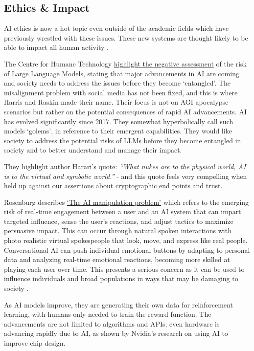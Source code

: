 \subsection{Ethics \& Impact}
AI ethics is now a hot topic even outside of the academic fields which have previously wrestled with these issues. These new systems are thought likely to be able to impact all human activity \cite{eloundou2023gpts}. \par
The Centre for Humane Technology \href{https://www.humanetech.com/key-issues}{highlight the negative assessment} of the risk of Large Language Models, stating that major advancements in AI are coming and society needs to address the issues before they become `entangled'. The misalignment problem with social media has not been fixed, and this is where Harris and Raskin made their name. Their focus is not on AGI apocalypse scenarios but rather on the potential consequences of rapid AI advancements. AI has evolved significantly since 2017. They somewhat hyperbolically call such models `golems', in reference to their emergent capabilities. They would like society to address the potential risks of LLMs before they become entangled in society and to better understand and manage their impact.\par
They highlight author \cite{harari2014sapiens} Harari's quote: \textit{``What nukes are to the physical world, AI is to the virtual and symbolic world.''} - and this quote feels very compelling when held up against our assertions about cryptographic end points and trust.\par
Rosenburg describes \href{https://bigthink.com/the-present/danger-conversational-ai/}{`The AI manipulation problem'} which refers to the emerging risk of real-time engagement between a user and an AI system that can impart targeted influence, sense the user's reactions, and adjust tactics to maximize persuasive impact. This can occur through natural spoken interactions with photo realistic virtual spokespeople that look, move, and express like real people. Conversational AI can push individual emotional buttons by adapting to personal data and analyzing real-time emotional reactions, becoming more skilled at playing each user over time. This presents a serious concern as it can be used to influence individuals and broad populations in ways that may be damaging to society \cite{Rosenberg2023}. \par
As AI models improve, they are generating their own data for reinforcement learning, with humans only needed to train the reward function. The advancements are not limited to algorithms and APIs; even hardware is advancing rapidly due to AI, as shown by Nvidia's research on using AI to improve chip design.\par
